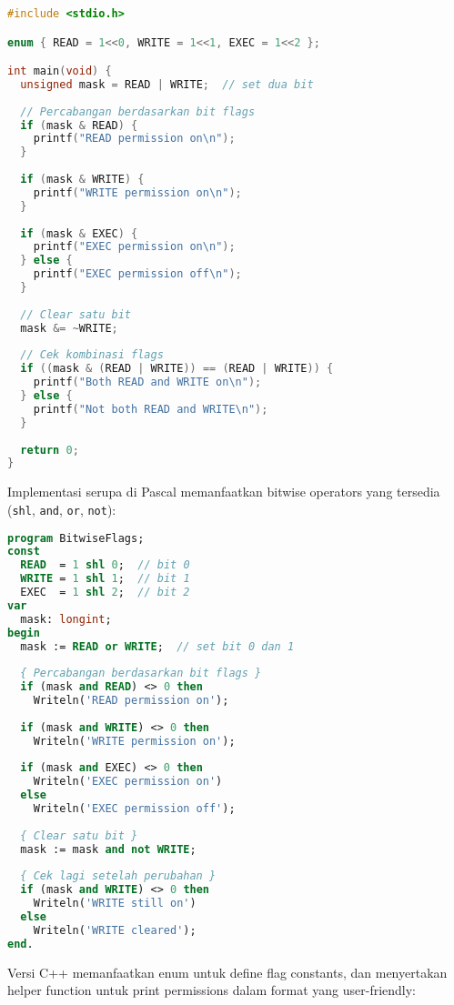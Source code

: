 \documentclass[../main.tex]{subfiles}
\begin{document}
\begin{lstlisting}[language=C, caption={Bit flags dengan kondisi di C}]
#include <stdio.h>

enum { READ = 1<<0, WRITE = 1<<1, EXEC = 1<<2 };

int main(void) {
  unsigned mask = READ | WRITE;  // set dua bit
  
  // Percabangan berdasarkan bit flags
  if (mask & READ) {
    printf("READ permission on\n");
  }
  
  if (mask & WRITE) {
    printf("WRITE permission on\n");
  }
  
  if (mask & EXEC) {
    printf("EXEC permission on\n");
  } else {
    printf("EXEC permission off\n");
  }
  
  // Clear satu bit
  mask &= ~WRITE;
  
  // Cek kombinasi flags
  if ((mask & (READ | WRITE)) == (READ | WRITE)) {
    printf("Both READ and WRITE on\n");
  } else {
    printf("Not both READ and WRITE\n");
  }
  
  return 0;
}
\end{lstlisting}

Implementasi serupa di Pascal memanfaatkan bitwise operators yang tersedia (\texttt{shl}, \texttt{and}, \texttt{or}, \texttt{not}):

\begin{lstlisting}[language=Pascal, caption={Pergeseran dan bitwise dengan kondisi di Pascal}]
program BitwiseFlags;
const
  READ  = 1 shl 0;  // bit 0
  WRITE = 1 shl 1;  // bit 1
  EXEC  = 1 shl 2;  // bit 2
var
  mask: longint;
begin
  mask := READ or WRITE;  // set bit 0 dan 1
  
  { Percabangan berdasarkan bit flags }
  if (mask and READ) <> 0 then
    Writeln('READ permission on');
  
  if (mask and WRITE) <> 0 then
    Writeln('WRITE permission on');
  
  if (mask and EXEC) <> 0 then
    Writeln('EXEC permission on')
  else
    Writeln('EXEC permission off');
  
  { Clear satu bit }
  mask := mask and not WRITE;
  
  { Cek lagi setelah perubahan }
  if (mask and WRITE) <> 0 then
    Writeln('WRITE still on')
  else
    Writeln('WRITE cleared');
end.
\end{lstlisting}

Versi C++ memanfaatkan enum untuk define flag constants, dan menyertakan helper function untuk print permissions dalam format yang user-friendly:
\end{document}

